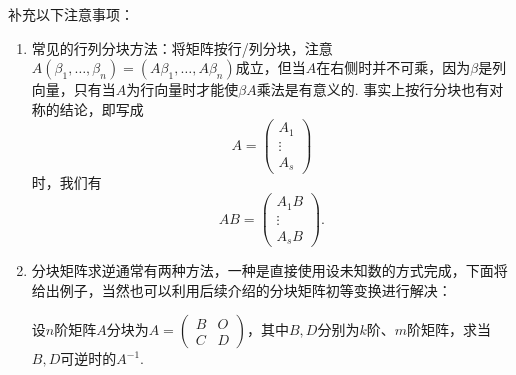 补充以下注意事项：
\begin{enumerate}
    \item 常见的行列分块方法：将矩阵按行/列分块，注意$A(\beta_1,\ldots,\beta_n)=(A\beta_1,\ldots,A\beta_n)$成立，但当$A$在右侧时并不可乘，因为$\beta$是列向量，只有当$A$为行向量时才能使$\beta A$乘法是有意义的. 事实上按行分块也有对称的结论，即写成
          \[A=\begin{pmatrix}
                  A_1 \\ \vdots \\ A_s
              \end{pmatrix}\]
          时，我们有
          \[AB=\begin{pmatrix}
                  A_1B \\ \vdots \\ A_sB
              \end{pmatrix}.\]

    \item 分块矩阵求逆通常有两种方法，一种是直接使用设未知数的方式完成，下面将给出例子，当然也可以利用后续介绍的分块矩阵初等变换进行解决：
          \begin{example}{}{}
              设$n$阶矩阵$A$分块为$A=\begin{pmatrix}
                      B & O \\ C & D
                  \end{pmatrix}$，其中$B,D$分别为$k$阶、$m$阶矩阵，求当$B,D$可逆时的$A^{-1}$.
          \end{example}


\end{enumerate}
